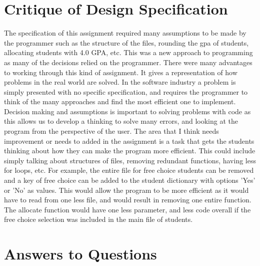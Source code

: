 \documentclass[12pt]{article}
\begin{document}
\section{Critique of Design Specification}
The specification of this assignment required many assumptions to be made by the programmer such as the structure of the files,
rounding the gpa of students, allocating students with 4.0 GPA, etc. This was a new approach to programming as many of the decisions relied on
the programmer. There were many advantages to working through this kind of assignment. It gives a representation of how problems in the real world
are solved. In the software industry a problem is simply presented with no specific specification, and requires the programmer to think of the many
approaches and find the most efficient one to implement. Decision making and assumptions is important to solving problems with code as this allows 
us to develop a thinking to solve many errors, and looking at the program from the perspective of the user. The area that I think needs improvement or
needs to added in the assignment is a task that gets the students thinking about how they can make the program more efficient. This could include simply
talking about structures of files, removing redundant functions, having less for loops, etc. For example, the entire file for free choice students can be 
removed and a key of free choice can be added to the student dictionary with options 'Yes' or 'No' as values. This would allow the program to be more efficient as it 
would have to read from one less file, and would result in removing one entire function. The allocate function would have one less parameter, and less code 
overall if the free choice selection was included in the main file of students. 

\section{Answers to Questions}
\end{document}
